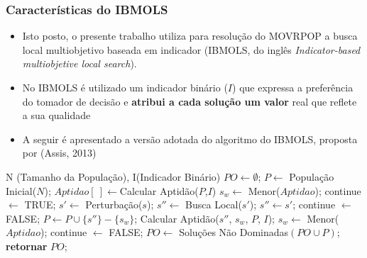 \documentclass{beamer}
\begin{document}
\begin{frame}
 \frametitle{Características do IBMOLS}
 \begin{itemize}
  \item Isto posto, o presente trabalho utiliza para resolução do MOVRPOP a busca local multiobjetivo baseada em indicador (IBMOLS, do inglês \emph{Indicator-based 
  multiobjetive local search}).    
  \item No IBMOLS é utilizado um indicador binário (${I}$) que expressa a preferência do tomador de decisão e \textbf{atribui a cada solução um valor} real que reflete 
  a sua qualidade
  \item A seguir é apresentado a versão adotada do algoritmo do IBMOLS, proposta por (Assis, 2013)
  
 \end{itemize}
  
\end{frame}

\begin{frame}
\tiny{
 \begin{algorithmic}[1]
  \REQUIRE N (Tamanho da População), I(Indicador Binário) %
  \STATE $PO \leftarrow \emptyset$; %
  \REPEAT %
  		\STATE $P \leftarrow $ População Inicial($N$);  %
  		\STATE $Aptidao[~] \leftarrow $Calcular Aptidão($P$,$I$) %
  		\STATE $s_{w} \leftarrow$ Menor($Aptidao$); %
  				\STATE continue $\leftarrow$ TRUE; %
  				\STATE $s' \leftarrow$ Perturbação($s$);  %
  				\STATE $s'' \leftarrow$ Busca Local($s'$); %
   					\STATE $s'' \leftarrow s'$;  continue $\leftarrow$ FALSE; %
   				\ENDIF %
   					\STATE $P \leftarrow P \cup \{s''\} - \{s_{w}\}$;
   					\STATE Calcular Aptidão($s''$, $s_{w}$, $P$, $I$);
   					\STATE $s_{w} \leftarrow$ Menor($Aptidao$); 
   				\ELSE 
   					\STATE continue $\leftarrow$ FALSE;
   				\ENDIF
   				\ENDWHILE
  		\ENDFOR
  		 \STATE $PO \leftarrow$ Soluções Não Dominadas$(PO \cup P)$;
  \STATE \textbf{retornar} $PO$;
 \end{algorithmic} }

\end{frame}
\end{document}
